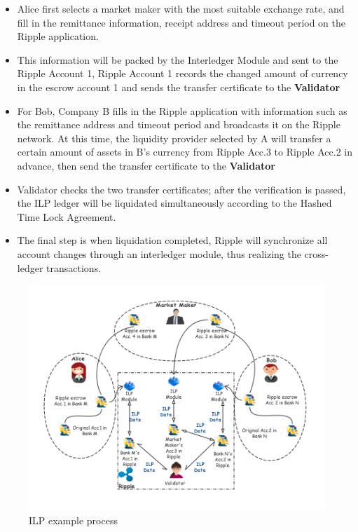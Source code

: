 \begin{itemize}
    \item Alice first selects a market maker with the most suitable exchange rate, and fill in the remittance information, receipt address and timeout period on the Ripple application.
    \item This information will be packed by the Interledger Module and sent to the Ripple Account 1, Ripple Account 1 records the changed amount of currency in the escrow account 1 and sends the transfer certificate to the \textbf{Validator}
    \item For Bob, Company B fills in the Ripple application with information such as the remittance address and timeout period and broadcasts it on the Ripple network. At this time, the liquidity provider selected by A will transfer a certain amount of assets in B's currency from Ripple Acc.3 to Ripple Acc.2 in advance, then send the transfer certificate to the \textbf{Validator}
    \item Validator checks the two transfer certificates; after the verification is passed, the ILP ledger will be liquidated simultaneously according to the Hashed Time Lock Agreement.
    \item The final step is when liquidation completed, Ripple will synchronize all account changes through an interledger module, thus realizing the cross-ledger transactions.
\end{itemize}
        \begin{figure}[H]
        \includegraphics[width=1\textwidth]{./figures/ILP.png}
        \centering
        \caption{ILP example process}%
        \centering
        \label{fig:ILP}
        \end{figure}
